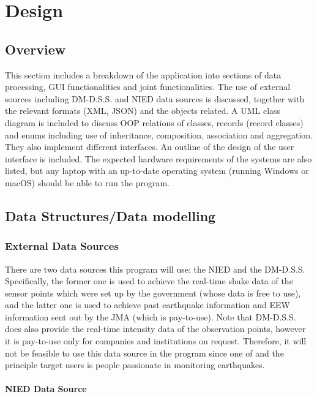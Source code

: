 \chapter{Design}
\section*{Overview}
This section includes a breakdown of the application into sections of data processing, GUI functionalities and joint functionalities. The use of external sources including DM-D.S.S. and NIED data sources is discussed, together with the relevant formats (XML, JSON) and the objects related. A UML class diagram is included to discuss OOP relations of classes, records (record classes) and enums including use of inheritance, composition, association and aggregation. They also implement different interfaces. An outline of the design of the user interface is included. The expected hardware requirements of the systems are also listed, but any laptop with an up-to-date operating system (running Windows or macOS) should be able to run the program.

\section{Data Structures/Data modelling}

\subsection{External Data Sources}
There are two data sources this program will use: the NIED and the DM-D.S.S. Specifically, the former one is used to achieve the real-time shake data of the sensor points which were set up by the government (whose data is free to use), and the latter one is used to achieve past earthquake information and EEW information sent out by the JMA (which is pay-to-use). Note that DM-D.S.S. does also provide the real-time intensity data of the observation points, however it is pay-to-use only for companies and institutions on request. Therefore, it will not be feasible to use this data source in the program since one of and the principle target users is people passionate in monitoring earthquakes.

\subsubsection{NIED Data Source}

